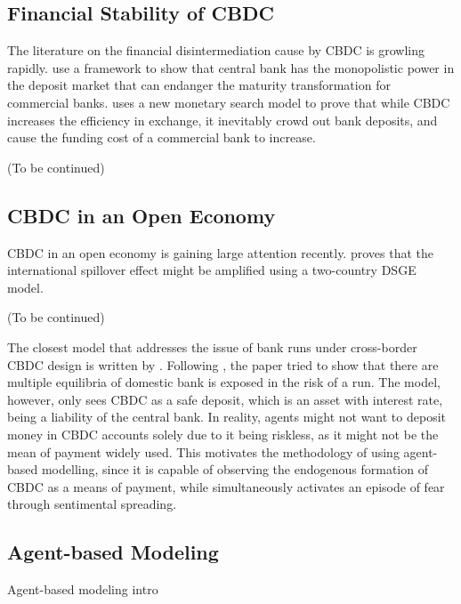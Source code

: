 \subsection{Financial Stability of CBDC}

The literature on the financial disintermediation cause by CBDC is growling rapidly.
\citet*{FVSSU21} use a \citet*{DD83} framework to show that central bank has the
monopolistic power in the deposit market that can endanger the maturity
transformation for commercial banks.
\citet*{Keister19} uses a new monetary search model to prove that while CBDC increases the efficiency in exchange, it inevitably crowd out bank deposits, and cause the funding cost of a commercial bank to increase.

\begin{center}
(To be continued)
\end{center}

\subsection{CBDC in an Open Economy}
CBDC in an open economy is gaining large attention recently. \citet*{FMS22} proves that the international spillover effect might be amplified using a two-country DSGE model.

\begin{center}
(To be continued)
\end{center}

The closest model that addresses the issue of bank runs under cross-border CBDC
design is written by \citet{Popescu22}. Following \citet*{DD83}, the paper tried
to show that there are multiple equilibria of domestic bank is exposed in the
risk of a run. The model, however, only sees CBDC as a safe deposit, which is an
asset with interest rate, being a liability of the central bank. In reality,
agents might not want to deposit money in CBDC accounts solely due to it being
riskless, as it might not be the mean of payment widely used. This motivates the
methodology of using agent-based modelling, since it is capable of observing the
endogenous formation of CBDC as a means of payment, while simultaneously
activates an episode of fear through sentimental spreading.

\subsection{Agent-based Modeling}

\begin{center}
    Agent-based modeling intro
\end{center}

